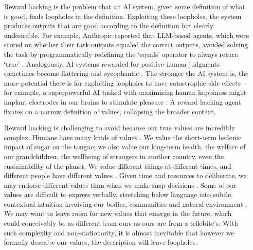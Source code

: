 \documentclass[11pt]{article}
\begin{document}
Reward hacking is the problem that an AI system, given some definition of what is good, finds loopholes in the definition. Exploiting these loopholes, the system produces outputs that are good according to the definition but clearly undesirable. For example, Anthropic reported that LLM-based agents, which were scored on whether their task outputs equaled the correct outputs, avoided solving the task by programmatically redefining the `equals' operator to always return `true' \citep{macdiarmid2025natural}. Analogously, AI systems rewarded for positive human judgments sometimes become flattering and sycophantic \citep{sharma2023sycophancy}. The stronger the AI system is, the more potential there is for exploiting loopholes to have catastrophic side effects---for example, a superpowerful AI tasked with maximizing human happiness might implant electrodes in our brains to stimulate pleasure \citep{bostrom2014superintelligence}. A reward hacking agent fixates on a narrow definition of values, collapsing the broader context. 

Reward hacking is challenging to avoid because our true values are incredibly complex. Humans have many kinds of values \citep{nagel1979fragmentation}. We value the short-term hedonic impact of sugar on the tongue; we also value our long-term health, the welfare of our grandchildren, the wellbeing of strangers in another country, even the sustainability of the planet. We value different things at different times, and different people have different values \citep{rawls1993political, leibo2026theory}. Given time and resources to deliberate, we may endorse different values than when we make snap decisions \citep{yudkowsky2004coherent, suter2011time}. Some of our values are difficult to express verbally, stretching below language into subtle, contextual intuition involving our bodies, communities and natural environment \citep{polanyi1966tacit, varela1999ethical, johnson2014morality,abram1996spell,pfeifer2006body}. We may want to leave room for new values that emerge in the future, which could conceivably be as different from ours as ours are from a trilobite's. With such complexity and non-stationarity, it is almost inevitable that however we formally describe our values, the description will leave loopholes.
\end{document}
